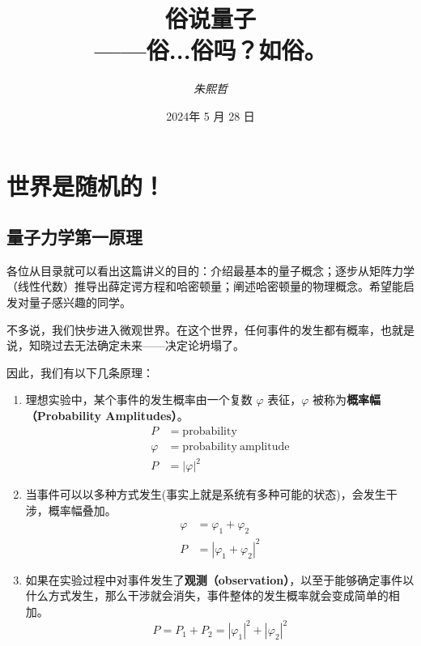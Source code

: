 \documentclass[12pt,a4paper,oneside]{book}
\title{\textbf{俗说量子\\\normalsize ——俗...俗吗？如俗。}}
\author{\textit{朱熙哲}}
\date{2024年 5 月 28 日}
\begin{document}
\maketitle
\tableofcontents
\chapter{世界是随机的！}
\section{量子力学第一原理}
各位从目录就可以看出这篇讲义的目的：介绍最基本的量子概念；逐步从矩阵力学（线性代数）推导出薛定谔方程和哈密顿量；阐述哈密顿量的物理概念。希望能启发对量子感兴趣的同学。

不多说，我们快步进入微观世界。在这个世界，任何事件的发生都有概率，也就是说，知晓过去无法确定未来——决定论坍塌了。

因此，我们有以下几条原理：\begin{enumerate}
    \item 理想实验中，某个事件的发生概率由一个复数 $\varphi$ 表征，$\varphi$ 被称为\textbf{概率幅（Probability Amplitudes）}。
    \begin{equation}
        \begin{aligned}
            P &= \mathrm{probability}\\
            \varphi &= \mathrm{probability\ amplitude}\\
            P &= |\varphi|^2
            \end{aligned}
    \end{equation}
    \item 当事件可以以多种方式发生(事实上就是系统有多种可能的状态)，会发生干涉，概率幅叠加。
    \begin{equation}
        \begin{aligned}
            \varphi &= \varphi_1+\varphi_2\\
            P &= |\varphi_1+\varphi_2|^2
            \end{aligned}
    \end{equation}
    \item 如果在实验过程中对事件发生了\textbf{观测（observation）}，以至于能够确定事件以什么方式发生，那么干涉就会消失，事件整体的发生概率就会变成简单的相加。
    \begin{equation}
        P=P_1+P_2=|\varphi_1|^2+|\varphi_2|^2
    \end{equation}
\end{enumerate}
\end{document}
